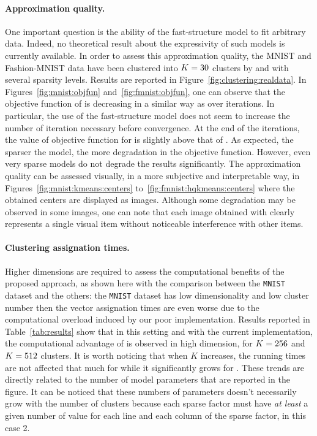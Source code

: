 \paragraph{Approximation quality.} One important question is the ability of the fast-structure model to fit arbitrary data.
Indeed, no theoretical result about the expressivity of such models is currently available.
In order to assess this approximation quality, the MNIST and Fashion-MNIST data have been clustered into $K=30$ clusters by \kmeans and \qkmeans with several sparsity levels.
Results are reported in Figure~\ref{fig:clustering:realdata}.
In Figures~\ref{fig:mnist:objfun} and~\ref{fig:fmnist:objfun}, one can observe that the objective function of \qkmeans is decreasing in a similar way as \kmeans over iterations.
In particular, the use of the fast-structure model does not seem to increase the number of iteration necessary before convergence.
At the end of the iterations, the value of objective function for \qkmeans is slightly above that of \kmeans.
As expected, the sparser the model, the more degradation in the objective function.
However, even very sparse models do not degrade the results significantly. %
The approximation quality can be assessed visually, in a more subjective and interpretable way, in Figures~\ref{fig:mnist:kmeans:centers} to~\ref{fig:fmnist:hqkmeans:centers} where the obtained centers are displayed as images.
Although some degradation may be observed in some images, one can note that each image obtained with \qkmeans clearly represents a single visual item without noticeable interference with other items.

\paragraph{Clustering assignation times.}
Higher dimensions are required to assess the computational benefits of the proposed approach, as shown here with the comparison between the \texttt{MNIST} dataset and the others: the \texttt{MNIST} dataset has low dimensionality and low cluster number then the vector assignation times are even worse due to the computational overload induced by our poor implementation. 
Results reported in Table~\ref{tab:results} show that in this setting and with the current implementation, the computational advantage of \qkmeans is observed in high dimension, for $K=256$ and $K=512$ clusters. It is worth noticing that when $K$ increases, the running times are not affected that much for \qkmeans while it significantly grows for \kmeans. These trends are directly related to the number of model parameters that are reported in the figure. It can be noticed that these numbers of parameters doesn't necessarily grow with the number of clusters because each sparse factor must have \textit{at least} a given number of value for each line and each column of the sparse factor, in this case 2. 


